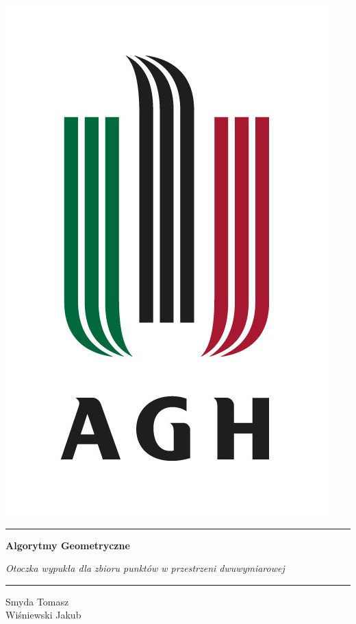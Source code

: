 \documentclass[12pt]{article}
\begin{document}
\begin{titlepage}
\scshape

\centering
\includegraphics[scale=0.9]{logo.jpg} \par %


\rule{\textwidth}{2px}
{\Huge{\textbf{Algorytmy Geometryczne }}}\par \vspace{0.4cm}
\huge{ \textit{Otoczka wypukła dla zbioru punktów w przestrzeni dwuwymiarowej}}
\rule{\textwidth}{2px}


\begin{center}
Smyda Tomasz \\
Wiśniewski Jakub
\end{center}


\end{titlepage}
\end{document}
